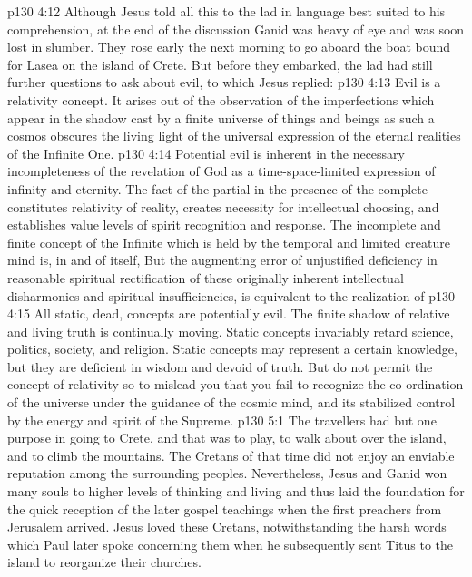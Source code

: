 \vs p130 4:12 \pc Although Jesus told all this to the lad in language best suited to his comprehension, at the end of the discussion Ganid was heavy of eye and was soon lost in slumber. They rose early the next morning to go aboard the boat bound for Lasea on the island of Crete. But before they embarked, the lad had still further questions to ask about evil, to which Jesus replied:
\vs p130 4:13 \pc Evil is a relativity concept. It arises out of the observation of the imperfections which appear in the shadow cast by a finite universe of things and beings as such a cosmos obscures the living light of the universal expression of the eternal realities of the Infinite One.
\vs p130 4:14 Potential evil is inherent in the necessary incompleteness of the revelation of God as a time\hyp{}space\hyp{}limited expression of infinity and eternity. The fact of the partial in the presence of the complete constitutes relativity of reality, creates necessity for intellectual choosing, and establishes value levels of spirit recognition and response. The incomplete and finite concept of the Infinite which is held by the temporal and limited creature mind is, in and of itself,  But the augmenting error of unjustified deficiency in reasonable spiritual rectification of these originally inherent intellectual disharmonies and spiritual insufficiencies, is equivalent to the realization of 
\vs p130 4:15 All static, dead, concepts are potentially evil. The finite shadow of relative and living truth is continually moving. Static concepts invariably retard science, politics, society, and religion. Static concepts may represent a certain knowledge, but they are deficient in wisdom and devoid of truth. But do not permit the concept of relativity so to mislead you that you fail to recognize the co\hyp{}ordination of the universe under the guidance of the cosmic mind, and its stabilized control by the energy and spirit of the Supreme.
\vs p130 5:1 The travellers had but one purpose in going to Crete, and that was to play, to walk about over the island, and to climb the mountains. The Cretans of that time did not enjoy an enviable reputation among the surrounding peoples. Nevertheless, Jesus and Ganid won many souls to higher levels of thinking and living and thus laid the foundation for the quick reception of the later gospel teachings when the first preachers from Jerusalem arrived. Jesus loved these Cretans, notwithstanding the harsh words which Paul later spoke concerning them when he subsequently sent Titus to the island to reorganize their churches.
